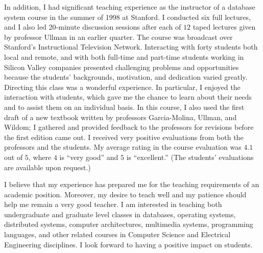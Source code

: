 \vspace{0.3cm}
In addition, I had significant teaching experience as
the instructor of a database system course in the
summer of 1998 at Stanford. I conducted six full lectures,
and I also led 20-minute discussion sessions after each of $12$
taped lectures given by professor Ullman in an earlier quarter. 
The course was broadcast over Stanford's Instructional
Television Network. Interacting with forty students
both local and remote,
and with both full-time and part-time students working in Silicon
Valley companies presented challenging problems and 
opportunities because the students' backgrounds, motivation, 
and dedication varied greatly. 
Directing this class was a wonderful experience. In particular,
I enjoyed the interaction with students, which gave me
the chance to learn about their needs and to assist them on an
individual basis. In this course, I also used the first draft of a new 
textbook written by professors Garcia-Molina, Ullman, 
and Wildom; I gathered and provided feedback to the 
professors for revisions before the first edition came out.  
I received very 
positive evaluations from both the professors and the students.
My average rating in the course evaluation was $4.1$ out of $5$, 
where $4$ is ``very good'' and $5$ is ``excellent.''
(The students' evaluations are available upon request.)

\vspace{0.3cm}
I believe that my experience has prepared me for the teaching
requirements of an academic position. Moreover, 
my desire to teach well and my patience should
help me remain a very good teacher. 
I am interested in teaching both
undergraduate and graduate level classes in databases, operating
systems, distributed systems, computer architectures, multimedia
systems, programming
languages, and other related courses in Computer Science
and Electrical Engineering disciplines. I look forward to 
having a positive impact on students.


